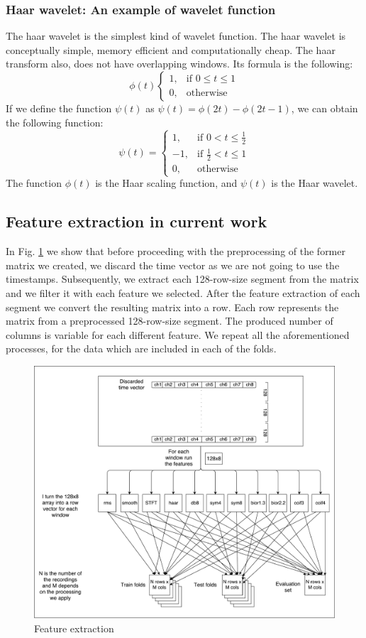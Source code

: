 \subsubsection{Haar wavelet: An example of wavelet function}
The haar wavelet is the simplest kind of wavelet function. The haar wavelet is conceptually simple, memory efficient and computationally cheap. The haar transform also, does not have overlapping windows. Its formula is the following:
\[
\phi (t)
\begin{cases}
         1, & \text{if  } 0 \leq t \leq 1 \\
         0, & \text{otherwise}
\end{cases}         
\]
If we define the function $\psi(t)$ as $\psi(t) = \phi(2t) - \phi(2t-1)$, we can obtain the following function:
\[
\psi(t) = 
\begin{cases}
1, & \text{if } 0 < t \leq \frac{1}{2} \\
-1, & \text{if } \frac{1}{2} < t \leq 1 \\
0, & \text{otherwise }
\end{cases}
\]
The function $\phi(t)$ is the Haar scaling function, and $\psi(t)$ is the Haar wavelet. \cite{lee_wavelet_1994}
\subsection{Feature extraction in current work}
In Fig. \ref{fig:feature_extraction} we show that before proceeding with the preprocessing of the former matrix we created, we discard the time vector as we are not going to use the timestamps. Subsequently, we extract each 128-row-size segment from the matrix and we filter it with each feature we selected. After the feature extraction of each segment we convert the resulting matrix into a row. Each row represents the matrix from a preprocessed 128-row-size segment. The produced number of columns is variable for each different feature. We repeat all the aforementioned processes, for the data which are included in each of the folds. 
\begin{figure}[h!]
\includegraphics[width=15cm,left,keepaspectratio]{figures/feature_extraction}
\caption{Feature extraction}
\label{fig:feature_extraction}
\end{figure}
